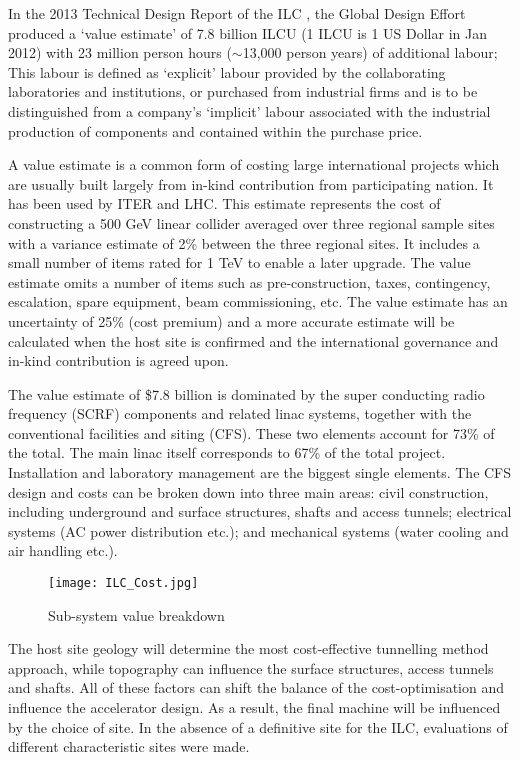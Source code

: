 In the 2013 Technical Design Report of the ILC \cite{ILC:TechnicalDesignReport}, the Global Design Effort produced a `value estimate' of 7.8 billion ILCU (1 ILCU is 1 US Dollar in Jan 2012) with 23 million person hours ($\sim$13,000 person years) of additional labour; This labour is defined as `explicit' labour provided by the collaborating laboratories and institutions, or purchased from industrial firms and is to be distinguished from a company's `implicit' labour associated with the industrial production of components and contained within the purchase price.  
 
A value estimate is a common form of costing large international projects which are usually built largely from in-kind contribution from participating nation. It has been used by ITER and LHC. This estimate represents the cost of constructing a 500 GeV linear collider averaged over three regional sample sites \textendash with a variance estimate of 2\% between the three regional sites. It includes a small number of items rated for 1 TeV to enable a later upgrade. The value estimate omits a number of items such as pre-construction, taxes, contingency, escalation, spare equipment, beam commissioning, etc. The value estimate has an uncertainty of 25\% (cost premium) and a more accurate estimate will be calculated when the host site is confirmed and the international governance and in-kind contribution is agreed upon.
 
The value estimate of \$7.8 billion is dominated by the super conducting radio frequency (SCRF) components and related linac systems, together with the conventional facilities and siting (CFS). These two elements account for 73\% of the total. The main linac itself corresponds to 67\% of the total project. Installation and laboratory management are the biggest single elements. The CFS design and costs can be broken down into three main areas: civil construction, including underground and surface structures, shafts and access tunnels; electrical systems (AC power distribution etc.); and mechanical systems (water cooling and air handling etc.).
 
\begin{figure}[!htb]
\centering
\texttt{[image: ILC\_Cost.jpg]}
\caption{Sub-system value breakdown \cite{ILC:TechnicalDesignReport}}
\end{figure}
 
The host site geology will determine the most cost-effective tunnelling method approach, while topography can influence the surface structures, access tunnels and shafts. All of these factors can shift the balance of the cost-optimisation and influence the accelerator design. As a result, the final machine will be influenced by the choice of site. In the absence of a definitive site for the ILC, evaluations of different characteristic sites were made. \cite{ILC:TechnicalDesignReport}
 
